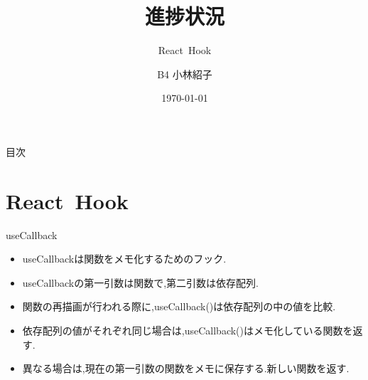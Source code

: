 \documentclass[aspectratio=169]{beamer}
\begin{document}
\title{進捗状況}
\subtitle{React\ Hook} 
\author{\small B4 小林紹子} %
\date{\small\today} %

\begin{frame}
    \titlepage
\end{frame}

\begin{frame}{目次}
    \tableofcontents
\end{frame}

\section{React\ Hook}

\begin{frame}{useCallback}
    \begin{itemize}
        \setlength{\itemsep}{2em}
        \item useCallbackは関数をメモ化するためのフック.
        \item useCallbackの第一引数は関数で,第二引数は依存配列.
        \item 関数の再描画が行われる際に,useCallback()は依存配列の中の値を比較.
        \item 依存配列の値がそれぞれ同じ場合は,useCallback()はメモ化している関数を返す.
        \item 異なる場合は,現在の第一引数の関数をメモに保存する.\rightarrowfill 新しい関数を返す.
    \end{itemize}
\end{frame}
\end{document}
